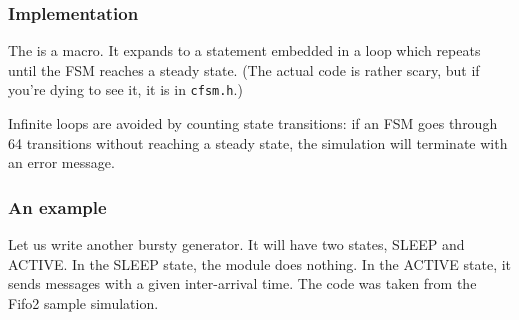 \subsubsection{Implementation}


The  is a macro. It expands to a 
statement embedded in a  loop which repeats until the
FSM reaches a steady state. (The actual code is rather
scary, but if you're dying to see it, it is in \texttt{cfsm.h}.)

Infinite loops are avoided by counting state transitions: if
an FSM goes through 64 transitions without reaching a steady
state, the simulation will terminate with an error message.


\subsubsection{An example}


Let us write another bursty generator. It will have two
states, SLEEP and ACTIVE. In the SLEEP state, the module does
nothing. In the ACTIVE state, it sends messages with a given
inter-arrival time. The code was taken from the Fifo2 sample
simulation.


